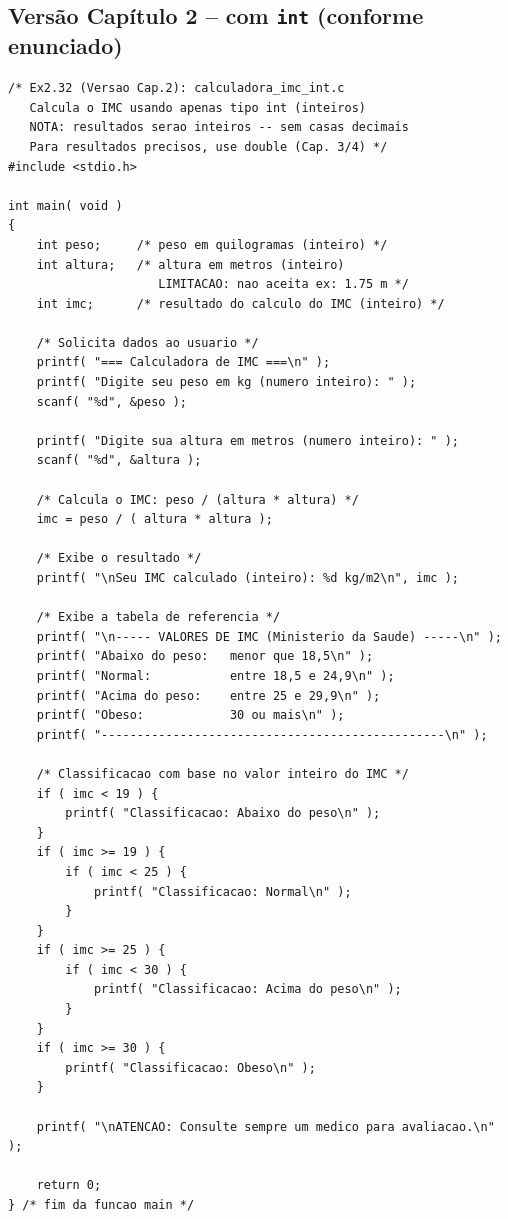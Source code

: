 \documentclass[12pt,a4paper]{article}
\begin{document}
\subsection{Versão Capítulo 2 -- com \texttt{int} (conforme enunciado)}

\begin{respostabox}
\begin{lstlisting}
/* Ex2.32 (Versao Cap.2): calculadora_imc_int.c
   Calcula o IMC usando apenas tipo int (inteiros)
   NOTA: resultados serao inteiros -- sem casas decimais
   Para resultados precisos, use double (Cap. 3/4) */
#include <stdio.h>

int main( void )
{
    int peso;     /* peso em quilogramas (inteiro) */
    int altura;   /* altura em metros (inteiro)
                     LIMITACAO: nao aceita ex: 1.75 m */
    int imc;      /* resultado do calculo do IMC (inteiro) */

    /* Solicita dados ao usuario */
    printf( "=== Calculadora de IMC ===\n" );
    printf( "Digite seu peso em kg (numero inteiro): " );
    scanf( "%d", &peso );

    printf( "Digite sua altura em metros (numero inteiro): " );
    scanf( "%d", &altura );

    /* Calcula o IMC: peso / (altura * altura) */
    imc = peso / ( altura * altura );

    /* Exibe o resultado */
    printf( "\nSeu IMC calculado (inteiro): %d kg/m2\n", imc );

    /* Exibe a tabela de referencia */
    printf( "\n----- VALORES DE IMC (Ministerio da Saude) -----\n" );
    printf( "Abaixo do peso:   menor que 18,5\n" );
    printf( "Normal:           entre 18,5 e 24,9\n" );
    printf( "Acima do peso:    entre 25 e 29,9\n" );
    printf( "Obeso:            30 ou mais\n" );
    printf( "------------------------------------------------\n" );

    /* Classificacao com base no valor inteiro do IMC */
    if ( imc < 19 ) {
        printf( "Classificacao: Abaixo do peso\n" );
    }
    if ( imc >= 19 ) {
        if ( imc < 25 ) {
            printf( "Classificacao: Normal\n" );
        }
    }
    if ( imc >= 25 ) {
        if ( imc < 30 ) {
            printf( "Classificacao: Acima do peso\n" );
        }
    }
    if ( imc >= 30 ) {
        printf( "Classificacao: Obeso\n" );
    }

    printf( "\nATENCAO: Consulte sempre um medico para avaliacao.\n" );

    return 0;
} /* fim da funcao main */
\end{lstlisting}


\end{respostabox}
\end{document}
